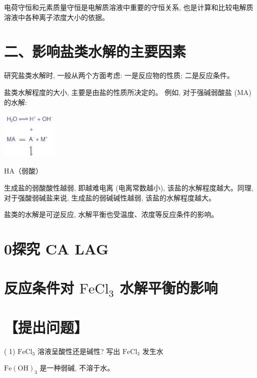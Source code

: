 \documentclass[10pt]{article}
\begin{document}
电荷守恒和元素质量守恒是电解质溶液中重要的守恒关系, 也是计算和比较电解质溶液中各种离子浓度大小的依据。

\section*{二、影响盐类水解的主要因素}

研究盐类水解时, 一般从两个方面考虑: 一是反应物的性质; 二是反应条件。

盐类水解程度的大小, 主要是由盐的性质所决定的。 例如, 对于强碱弱酸盐 (MA) 的水解:

\begin{center}
\includegraphics[max width=0.2\textwidth]{images/0190da9d-8bfd-732f-bc2c-0b21d0f13b91_80_109456.jpg}
\end{center}

HA（弱酸）

生成盐的弱酸酸性越弱, 即越难电离 (电离常数越小), 该盐的水解程度越大。同理, 对于强酸弱碱盐来说, 生成盐的弱碱碱性越弱, 该盐的水解程度越大。

盐类的水解是可逆反应, 水解平衡也受温度、浓度等反应条件的影响。

\section*{0探究 CA LAG}

\section*{反应条件对 \({\mathrm{{FeCl}}}_{3}\) 水解平衡的影响}

\section*{【提出问题】}

( 1) \({\mathrm{{FeCl}}}_{3}\) 溶液呈酸性还是碱性? 写出 \({\mathrm{{FeCl}}}_{3}\) 发生水

\begin{mdframed}

\(\mathrm{{Fe}}{\left( \mathrm{{OH}}\right) }_{3}\) 是一种弱碱, 不溶于水。

\end{mdframed}
\end{document}
